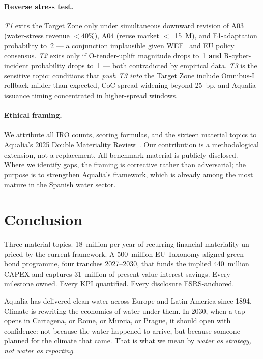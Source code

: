 \documentclass[11pt, a4paper]{article}
\newcommand{\euro}{\texteuro}
\begin{document}
\paragraph{Reverse stress test.}
\emph{T1} exits the Target Zone only under simultaneous downward revision of A03 (water-stress revenue $<40\%$), A04 (reuse market $<$~\euro{}15~M), and E1-adaptation probability to~2 --- a conjunction implausible given WEF~\cite{wef2025} and EU policy consensus. \emph{T2} exits only if O-tender-uplift magnitude drops to~1 \textbf{and} R-cyber-incident probability drops to~1 --- both contradicted by empirical data. \emph{T3} is the sensitive topic: conditions that \emph{push T3 into} the Target Zone include Omnibus-I rollback milder than expected, CoC spread widening beyond 25~bp, and Aqualia issuance timing concentrated in higher-spread windows.

\paragraph{Ethical framing.}
We attribute all IRO counts, scoring formulas, and the sixteen material topics to Aqualia's 2025 Double Materiality Review~\cite{aqualiaDMReview2025, aqualiaMethodology2025}. Our contribution is a methodological extension, not a replacement. All benchmark material is publicly disclosed. Where we identify gaps, the framing is corrective rather than adversarial; the purpose is to strengthen Aqualia's framework, which is already among the most mature in the Spanish water sector.

\section{Conclusion}
\label{sec:conclusion}

Three material topics. \euro{}18~million per year of recurring financial materiality un-priced by the current framework. A \euro{}500~million EU-Taxonomy-aligned green bond programme, four tranches 2027--2030, that funds the implied \euro{}440~million CAPEX and captures \euro{}31~million of present-value interest savings. Every milestone owned. Every KPI quantified. Every disclosure ESRS-anchored.

Aqualia has delivered clean water across Europe and Latin America since 1894. Climate is rewriting the economics of water under them. In 2030, when a tap opens in Cartagena, or Rome, or Murcia, or Prague, it should open with confidence: not because the water happened to arrive, but because someone planned for the climate that came. That is what we mean by \emph{water as strategy, not water as reporting}.
\end{document}
